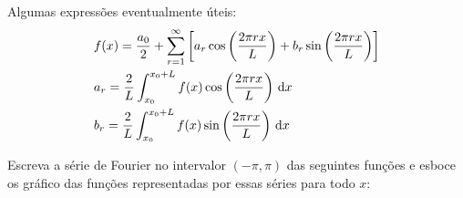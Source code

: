 \documentclass[a4paper,12pt, leqno, answers]{exam}
\begin{document}
\thispagestyle{empty}

\newpage
\setcounter{page}{1}

Algumas express\~{o}es eventualmente \'{u}teis:
\begin{align}
    & f(x) = \frac{a_0}{2} + \sum_{r = 1}^\infty \left[ a_r \cos\left( \frac{2 \pi r x}{L} \right) + b_r \sin\left( \frac{2 \pi r x}{L} \right) \right] \label{eq:serie_fourier} \\
    & a_r = \frac{2}{L} \int_{x_0}^{x_0 + L} f(x) \cos\left( \frac{2 \pi r x}{L} \right) \, \mathrm{d}x \label{eq:serie_fourier_a} \\
    & b_r = \frac{2}{L} \int_{x_0}^{x_0 + L} f(x) \sin\left( \frac{2 \pi r x}{L} \right) \, \mathrm{d}x \label{eq:serie_fourier_b}
\end{align}
\begin{questions}
    \question Escreva a s\'{e}rie de Fourier no intervalor $(-\pi, \pi)$ das seguintes fun\c{c}\~{o}es e esboce os gr\'{a}fico das fun\c{c}\~{o}es representadas por essas s\'{e}ries para todo $x$:
    \begin{parts}

\end{parts}
\end{questions}
\end{document}

